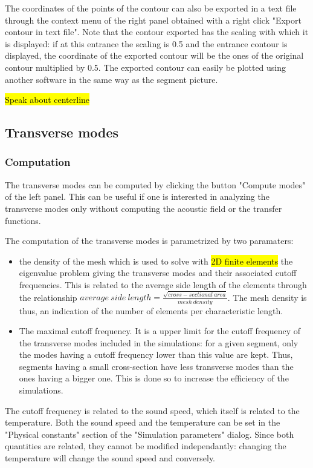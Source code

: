 \documentclass[]{article}
\begin{document}
	The coordinates of the points of the contour can also be exported 
	in a text file through the context menu of the right panel obtained
	with a right click "Export contour in text file". 
	Note that the contour exported has the scaling with which it is 
	displayed: if at this entrance the scaling is 0.5 and the entrance 
	contour is displayed, the coordinate of the exported contour will
	be the ones of the original contour multiplied by 0.5.
	The exported contour can easily be plotted using another software in 
	the same way as the segment picture.
	
	\hl{Speak about centerline}
	
	\subsection{Transverse modes}
	
	\subsubsection{Computation}
	
	The transverse modes can be computed by clicking the button
	"Compute modes" of the left panel. This can be useful if one is interested in analyzing the transverse modes only without 
	computing the acoustic field or the transfer functions.
	
	The computation of the transverse modes is parametrized by two 
	paramaters: 
	\begin{itemize}
		\item the density of the mesh which is used to solve with 
		\hl{2D finite elements} the 
		eigenvalue problem giving the transverse modes and their 
		associated cutoff frequencies. This is related to the average
		side length of the elements through the relationship
		$average~side~length = \frac{\sqrt{cross-sectional~area}}{mesh~density}$. 
		The mesh density is thus, an indication of the number of
		elements per characteristic length.
		\item The maximal cutoff frequency. It is a upper limit for the 
		cutoff frequency of the transverse modes included in the 
		simulations: for a given segment, only the modes having a cutoff
		frequency lower than this value are kept. Thus, segments having 
		a small cross-section have less transverse modes than the ones
		having a bigger one. This is done so to increase the efficiency 
		of the simulations.
	\end{itemize}

	The cutoff frequency is related to the sound speed, which itself 
	is related to the temperature. Both the sound speed and the 
	temperature can be set in the "Physical constants" section of 
	the "Simulation parameters" dialog. Since both quantities are
	related, they cannot be modified independantly: changing the 
	temperature will change the sound speed and conversely.
\end{document}
